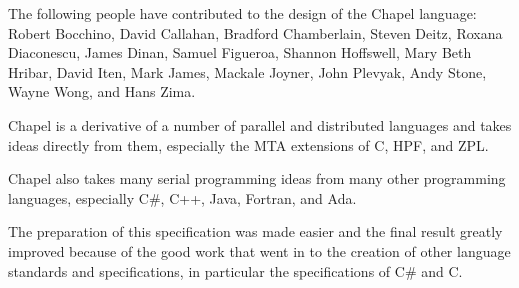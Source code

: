 \label{Acknowledgments}

The following people have contributed to the design of the Chapel
language:
Robert Bocchino,
David Callahan,
Bradford Chamberlain,
Steven Deitz,
Roxana Diaconescu,
James Dinan,
Samuel Figueroa,
Shannon Hoffswell,
Mary Beth Hribar,
David Iten,
Mark James,
Mackale Joyner,
John Plevyak,
Andy Stone,
Wayne Wong,
and Hans Zima.

Chapel is a derivative of a number of parallel and distributed
languages and takes ideas directly from them, especially the MTA
extensions of C, HPF, and ZPL.

Chapel also takes many serial programming ideas from many other
programming languages, especially C\#, C++, Java, Fortran, and Ada.

The preparation of this specification was made easier and the final
result greatly improved because of the good work that went in to the
creation of other language standards and specifications, in particular
the specifications of C\# and C.
